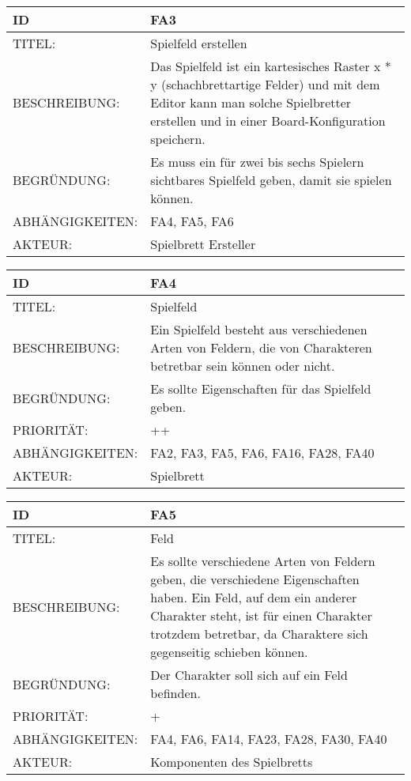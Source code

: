 \documentclass{uulm-assignment}
\begin{document}
    \begin{tabularx}{\textwidth}{|l|X |} \hline
        \textbf{ID} & \textbf{FA3} \\
        \hline
        TITEL: & Spielfeld erstellen \\
        \hline
        BESCHREIBUNG: & Das Spielfeld ist ein kartesisches Raster x * y (schachbrettartige Felder) und mit dem Editor kann man solche Spielbretter erstellen und in einer Board-Konfiguration speichern. 
        \\
        \hline
        BEGRÜNDUNG: & Es muss ein für zwei bis sechs Spielern sichtbares Spielfeld geben, damit sie spielen können.\\
        \hline
        ABHÄNGIGKEITEN: & FA4, FA5, FA6\\
        \hline
        AKTEUR: & Spielbrett Ersteller
        \\
        \hline
    \end{tabularx}

    \begin{tabularx}{\textwidth}{|l|X |} \hline
        \textbf{ID} & \textbf{FA4} \\
        \hline
        TITEL: & Spielfeld \\
        \hline
        BESCHREIBUNG: & Ein Spielfeld besteht aus verschiedenen Arten von Feldern, die von Charakteren betretbar sein können oder nicht. 
        \\
        \hline
        BEGRÜNDUNG: & Es sollte Eigenschaften für das Spielfeld geben. \\
        \hline
        PRIORITÄT: & ++\\
        \hline
        ABHÄNGIGKEITEN: & FA2, FA3, FA5, FA6, FA16, FA28, FA40\\
        \hline
        AKTEUR: & Spielbrett
        \\
        \hline
    \end{tabularx}

    \begin{tabularx}{\textwidth}{|l|X |} \hline
        \textbf{ID} & \textbf{FA5} \\
        \hline
        TITEL: &  Feld\\
        \hline
        BESCHREIBUNG: & Es sollte verschiedene Arten von Feldern geben, die verschiedene Eigenschaften haben. Ein Feld, auf dem ein anderer Charakter steht, ist für einen Charakter trotzdem betretbar, da Charaktere sich gegenseitig schieben können. 
        \\
        \hline
        BEGRÜNDUNG: & Der Charakter soll sich auf ein Feld befinden.\\
        \hline
        PRIORITÄT: & +\\
        \hline
        ABHÄNGIGKEITEN: & FA4, FA6, FA14, FA23, FA28, FA30, FA40\\
        \hline
        AKTEUR: & Komponenten des Spielbretts
        \\
        \hline
    \end{tabularx}
    
\end{document}
